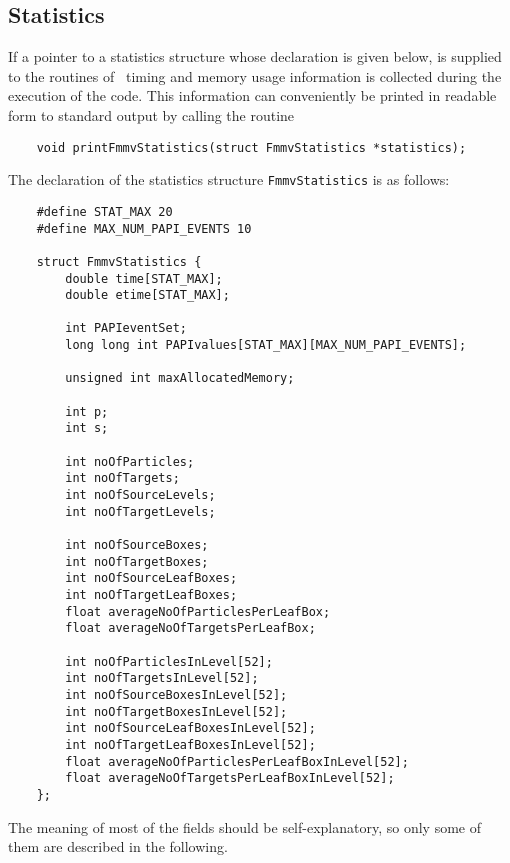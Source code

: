 \subsection{Statistics}\label{statistics}
If a pointer to a statistics structure whose
declaration is given below, is supplied to the
routines of \fmmv\, timing and memory usage information
is collected during the execution of the code.
This information can conveniently be printed
in readable form
to standard output by  calling the routine
\begin{verbatim}  
    void printFmmvStatistics(struct FmmvStatistics *statistics);
\end{verbatim}
The declaration of the statistics 
structure \verb|FmmvStatistics| is as follows:
\begin{verbatim}
    #define STAT_MAX 20
    #define MAX_NUM_PAPI_EVENTS 10

    struct FmmvStatistics {
        double time[STAT_MAX];
        double etime[STAT_MAX];

        int PAPIeventSet;
        long long int PAPIvalues[STAT_MAX][MAX_NUM_PAPI_EVENTS];

        unsigned int maxAllocatedMemory;

        int p;
        int s;

        int noOfParticles;
        int noOfTargets;
        int noOfSourceLevels;
        int noOfTargetLevels;

        int noOfSourceBoxes;
        int noOfTargetBoxes;
        int noOfSourceLeafBoxes;
        int noOfTargetLeafBoxes;
        float averageNoOfParticlesPerLeafBox;
        float averageNoOfTargetsPerLeafBox;
    
        int noOfParticlesInLevel[52];
        int noOfTargetsInLevel[52];
        int noOfSourceBoxesInLevel[52];
        int noOfTargetBoxesInLevel[52];
        int noOfSourceLeafBoxesInLevel[52];
        int noOfTargetLeafBoxesInLevel[52];
        float averageNoOfParticlesPerLeafBoxInLevel[52];
        float averageNoOfTargetsPerLeafBoxInLevel[52];
    };
\end{verbatim}
The meaning of most of the fields should be self-explanatory, so only
some of them are described in the following.
